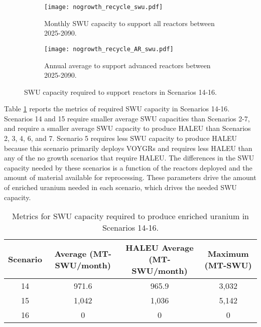 \begin{figure}[h!]
    \centering
    \begin{subfigure}[b]{0.45\textwidth}
        \centering
        \texttt{[image: nogrowth\_recycle\_swu.pdf]}
        \caption{Monthly SWU capacity to support all reactors between 2025-2090.}
        \label{fig:nogrowth_recycle_swu_all}
    \end{subfigure}
    \hfill
    \begin{subfigure}[b]{0.45\textwidth}
        \centering
        \texttt{[image: nogrowth\_recycle\_AR\_swu.pdf]}
        \caption{Annual average to support advanced reactors between 2025-2090.}
        \label{fig:nogrowth_recycle_swu_AR}
    \end{subfigure}
       \caption{\gls{SWU} capacity required to support 
       reactors in Scenarios 14-16.}
       \label{fig:nogrowth_recycle_swu}
\end{figure}

Table \ref{tab:s14-16_swu} reports the metrics of required \gls{SWU} 
capacity in Scenarios 14-16. Scenarios 14 and 15 require smaller 
average \gls{SWU} capacities than Scenarios 2-7, and require a 
smaller average \gls{SWU} capacity to produce \gls{HALEU} than 
Scenarios 2, 3, 4, 6, and 7. Scenario 5 requires less \gls{SWU} 
capacity to produce \gls{HALEU} because this scenario 
primarily deploys VOYGRs and requires less \gls{HALEU} than 
any of the no growth scenarios that require \gls{HALEU}. 
The differences in the 
\gls{SWU} capacity needed by these scenarios is a function of 
the reactors deployed and the amount of material available for 
reprocessing. These parameters drive the amount of enriched 
uranium needed in each scenario, which drives the needed 
\gls{SWU} capacity.

\begin{table}[h!]
    \centering 
    \caption{Metrics for \gls{SWU} capacity required to produce 
    enriched uranium in Scenarios 14-16.}
    \label{tab:s14-16_swu}
    \begin{tabular}{c c c c}
        \hline 
        Scenario & Average (MT-SWU/month) & HALEU Average (MT-SWU/month)
         & Maximum (MT-SWU) \\
        \hline 
        14 & 971.6 & 965.9 & 3,032 \\
        15 & 1,042 & 1,036 & 5,142 \\
        16 & 0 & 0 & 0 \\
        \hline
        
    \end{tabular}
\end{table}

